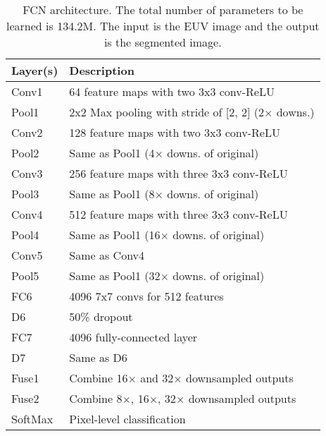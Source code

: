 \color{blue}
\begin{table}[t!]
	\centering	
	\caption{\color{blue}
		FCN architecture.
		The total number of parameters to be learned is 134.2M.
		The input is the EUV image and the output is the segmented image.
	}
	\label{tab:fcn_arch}
	\color{blue}
	\begin{tabular}{p{1cm} p{7cm}}
		\toprule
		\textbf{Layer(s)} & \textbf{Description}\\
		\midrule
		Conv1	& 64 feature maps with two 3x3 conv-ReLU \\
		Pool1	& 2x2 Max pooling with stride of [2, 2] (2$\times$ downs.) \\
		Conv2	& 128 feature maps with two 3x3 conv-ReLU\\
		Pool2	& Same as Pool1 (4$\times$ downs. of original)\\
		Conv3	& 256 feature maps with three 3x3 conv-ReLU\\
		Pool3	& Same as Pool1 (8$\times$ downs. of original) \\
		Conv4	& 512 feature maps with three 3x3 conv-ReLU\\
		Pool4	& Same as Pool1 (16$\times$ downs. of original)\\
		Conv5	& Same as Conv4\\
		Pool5	& Same as Pool1 (32$\times$ downs. of original)\\
		FC6	    & 4096 7x7 convs for 512 features\\
		D6   	& 50\% dropout\\						
		FC7	    & 4096 fully-connected layer \\
		D7	    & Same as D6\\
		Fuse1	& Combine 16$\times$ and 32$\times$ downsampled outputs \\
		Fuse2	& Combine 8$\times$, 16$\times$, 32$\times$  downsampled outputs \\
		SoftMax	& Pixel-level classification\\
		\bottomrule
	\end{tabular}
\end{table}
\color{black}
